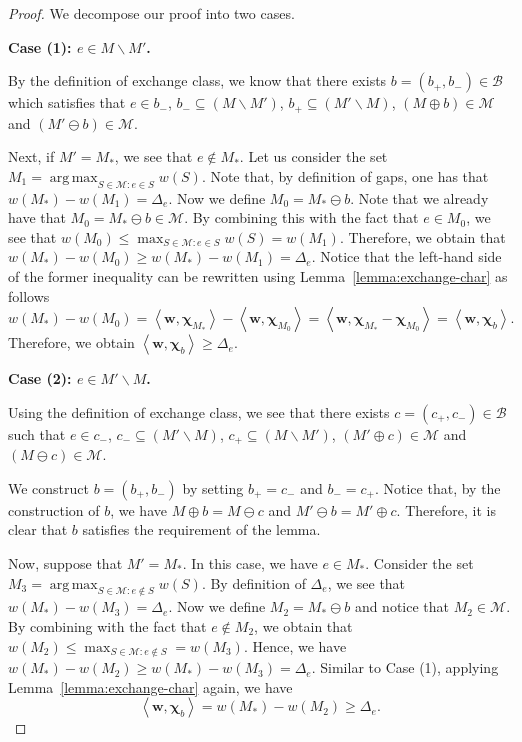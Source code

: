 \documentclass{article}
\newcommand{\M}{\mathcal M}
\newcommand{\B}{\mathcal B}
\newcommand{\del}{\backslash}
\DeclareMathOperator*{\argmax}{arg\,max}
\newcommand{\inn}[1]{\left\langle #1 \right\rangle}
\renewcommand{\vec}[1]{\boldsymbol{#1}}
\begin{document}
\begin{proof}
We decompose our proof into two cases.

\textbf{Case (1): $e\in M\del M'$.}

By the definition of exchange class, we know that 
there exists $b=(b_+, b_-) \in \B$ which satisfies that
$e\in b_-$, $b_- \subseteq (M\del M') $, $b_+\subseteq (M' \del M)$, $(M\oplus b) \in \M$ and $(M'\ominus b) \in \M$.

Next, if $M'=M_*$, we see that $e\not \in M_*$.
Let us consider the set $M_1 = \argmax_{S \in \M\colon e\in S} w(S)$.
Note that, by definition of gaps, one has that $w(M_*)-w(M_1) = \Delta_e$.
Now we define $M_0 = M_*\ominus b$. 
Note that we already have that $M_0=M_* \ominus b \in \M$.  
By combining this with the fact that $e\in M_0$, we see that $w(M_0) \le \max_{S\in \M\colon e\in S} w(S) = w(M_1)$. 
Therefore, we obtain that
$w(M_*)-w(M_0) \ge w(M_*)-w(M_1) = \Delta_e$.
Notice that the left-hand side of the former inequality can be rewritten using Lemma~\ref{lemma:exchange-char} as follows
$$
w(M_*)-w(M_0) = \inn{\vec w, \vec \chi_{M_*}}-\inn{\vec w, \vec \chi_{M_0}} = \inn{\vec w, \vec \chi_{M_*}-\vec\chi_{M_0}}
= \inn{\vec w,\vec \chi_b}.
$$
Therefore, we obtain $\inn{\vec w,\vec \chi_b} \ge \Delta_e$.

\textbf{Case (2): $e\in M'\del M$.}

Using the definition of exchange class, we see that 
there exists $c=(c_+,c_-)\in \B$ such that 
$e\in c_-$, $c_-\subseteq (M'\del M)$, $c_+\subseteq (M\del M')$, $(M'\oplus c)\in \M$
and $(M\ominus c)\in \M$.

We construct $b=(b_+,b_-)$ by setting $b_+=c_-$ and $b_-=c_+$. 
Notice that, by the construction of $b$, we have $M\oplus b = M\ominus c$ and $M'\ominus b = M'\oplus c$.
Therefore, it is clear that $b$ satisfies the requirement of the lemma.


Now, suppose that $M'=M_*$. 
In this case, we have $e\in M_*$.
Consider the set $M_3 = \argmax_{S \in \M\colon e\not \in S} w(S)$.
By definition of $\Delta_e$, we see that $w(M_*)-w(M_3)=\Delta_e$.
Now we define $M_2 = M_* \ominus b$ and notice that  $M_2 \in \M$.
By combining with the fact that $e\not \in M_2$, we obtain that $w(M_2) \le \max_{S\in \M\colon e\not\in S} = w(M_3)$.
Hence, we have
$w(M_*)-w(M_2) \ge w(M_*)-w(M_3)=\Delta_e$.
Similar to Case (1), applying Lemma~\ref{lemma:exchange-char} again, we have
$$
\inn{\vec w,\vec \chi_b} = w(M_*)-w(M_2) \ge \Delta_e.
$$
\end{proof}
\end{document}
